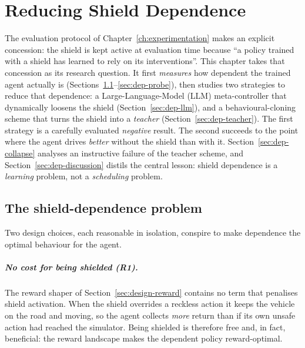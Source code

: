 
\chapter{Reducing Shield Dependence}\label{ch:dependence}

The evaluation protocol of Chapter~\ref{ch:experimentation} makes an explicit concession: the
shield is kept active at evaluation time because ``a policy trained with a shield has learned to
rely on its interventions''. This chapter takes that concession as its research question. It
first \emph{measures} how dependent the trained agent actually is
(Sections~\ref{sec:dep-problem}--\ref{sec:dep-probe}), then studies two strategies to reduce
that dependence: a Large-Language-Model (LLM) meta-controller that dynamically loosens the shield
(Section~\ref{sec:dep-llm}), and a behavioural-cloning scheme that turns the shield into a
\emph{teacher} (Section~\ref{sec:dep-teacher}). The first strategy is a carefully evaluated
\emph{negative} result. The second succeeds to the point where the agent drives \emph{better}
without the shield than with it. Section~\ref{sec:dep-collapse} analyses an instructive failure
of the teacher scheme, and Section~\ref{sec:dep-discussion} distils the central lesson: shield
dependence is a \emph{learning} problem, not a \emph{scheduling} problem.

\section{The shield-dependence problem}\label{sec:dep-problem}

Two design choices, each reasonable in isolation, conspire to make dependence the optimal
behaviour for the agent.

\paragraph{No cost for being shielded (R1).} The reward shaper of
Section~\ref{sec:design-reward} contains no term that penalises shield activation. When the
shield overrides a reckless action it keeps the vehicle on the road and moving, so the agent
collects \emph{more} return than if its own unsafe action had reached the simulator. Being
shielded is therefore free and, in fact, beneficial: the reward landscape makes the dependent
policy reward-optimal.

